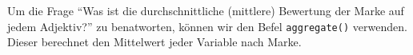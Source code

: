 \documentclass[12pt,]{book}
\makeatletter
\newenvironment{Shaded}{\begin{snugshade}}{\end{snugshade}}
\newcommand{\KeywordTok}[1]{\textcolor[rgb]{0.13,0.29,0.53}{\textbf{{#1}}}}
\newcommand{\DataTypeTok}[1]{\textcolor[rgb]{0.13,0.29,0.53}{{#1}}}
\newcommand{\StringTok}[1]{\textcolor[rgb]{0.31,0.60,0.02}{{#1}}}
\newcommand{\CommentTok}[1]{\textcolor[rgb]{0.56,0.35,0.01}{\textit{{#1}}}}
\newcommand{\NormalTok}[1]{{#1}}
\newenvironment{kframe}{%
\medskip{}
\setlength{\fboxsep}{.8em}
 \def\at@end@of@kframe{}%
 \ifinner\ifhmode%
  \def\at@end@of@kframe{\end{minipage}}%
  \begin{minipage}{\columnwidth}%
 \fi\fi%
 \def\FrameCommand##1{\hskip\@totalleftmargin \hskip-\fboxsep
 \colorbox{shadecolor}{##1}\hskip-\fboxsep
     \hskip-\linewidth \hskip-\@totalleftmargin \hskip\columnwidth}%
 \MakeFramed {\advance\hsize-\width
   \@totalleftmargin\z@ \linewidth\hsize
   \@setminipage}}%
 {\par\unskip\endMakeFramed%
 \at@end@of@kframe}
\renewenvironment{Shaded}{\begin{kframe}}{\end{kframe}}
\makeatother
\begin{document}
Um die Frage ``Was ist die durchschnittliche (mittlere) Bewertung der
Marke auf jedem Adjektiv?'' zu benatworten, können wir den Befel
\texttt{aggregate()} verwenden. Dieser berechnet den Mittelwert jeder
Variable nach Marke.

\begin{Shaded}
\end{Shaded}
\end{document}
